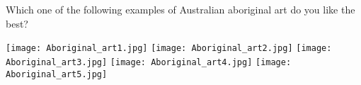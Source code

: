 \begin{tcolorbox}
Which one of the following examples of Australian aboriginal art do you like the best?

\texttt{[image: Aboriginal\_art1.jpg]}
\texttt{[image: Aboriginal\_art2.jpg]}
\texttt{[image: Aboriginal\_art3.jpg]}
\texttt{[image: Aboriginal\_art4.jpg]}
\texttt{[image: Aboriginal\_art5.jpg]}
\end{tcolorbox}
